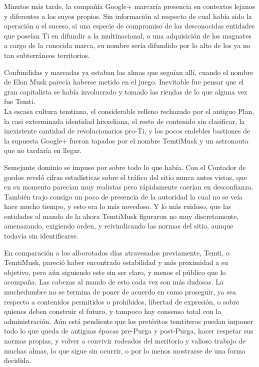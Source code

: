 \documentclass[
  spanish,
]{book}
\begin{document}
Minutos más tarde, la compañía Google+ marcaría presencia en contextos lejanos y diferentes a los suyos propios. Sin información al respecto de cual había sido la operación o el suceso, si una especie de compromiso de las desconocidas entidades que poseían Ti en difundir a la multinacional, o una adquisición de los magnates a cargo de la conocida marca, su nombre sería difundido por lo alto de los ya no tan subterráneos territorios.

Confundidas y mareadas ya estaban las almas que seguían allí, cuando el nombre de Elon Musk parecía haberse metido en el juego. Inevitable fue pensar que el gran capitalista se había involucrado y tomado las riendas de lo que alguna vez fue Temti.\\
La escasa cultura temtiana, el considerable relleno rechazado por el antiguo Plan, la casi exterminada identidad hixxeliana, el resto de contenido sin clasificar, la inexistente cantidad de revolucionarios pro-Ti, y los pocos endebles bastiones de la supuesta Google+ fueron tapados por el nombre TemtiMusk y un astronauta que no tardaría en llegar.

Semejante dominio se impuso por sobre todo lo que había. Con el Contador de gordos reveló cifras estadísticas sobre el tráfico del sitio nunca antes vistas, que en su momento parecían muy realistas pero rápidamente caerían en desconfianza. También trajo consigo un poco de presencia de la autoridad la cual no se veía hace mucho tiempo, y esto era lo más novedoso. Y lo más ruidoso, que las entidades al mando de la ahora TemtiMusk figuraron no muy discretamente, amenazando, exigiendo orden, y reivindicando las normas del sitio, aunque todavía sin identificarse.

En comparación a los alborotados días atravesados previamente, Temti, o TemtiMusk, pareció haber encontrado estabilidad y más proximidad a su objetivo, pero aún siguiendo este sin ser claro, y menos el público que lo acompaña. Las cabezas al mando de esto cada vez son más dudosas. La muchedumbre no se termina de poner de acuerdo en como proseguir, ya sea respecto a contenidos permitidos o prohibidos, libertad de expresión, o sobre quienes deben construir el futuro, y tampoco hay consenso total con la administración. Aún está pendiente que los pretéritos temtiteros puedan imponer todo lo que queda de antiguas épocas pre-Purga y post-Purga, hacer respetar sus normas propias, y volver a convivir rodeados del meritorio y valioso trabajo de muchas almas, lo que sigue sin ocurrir, o por lo menos mostrarse de una forma decidida.
\end{document}
